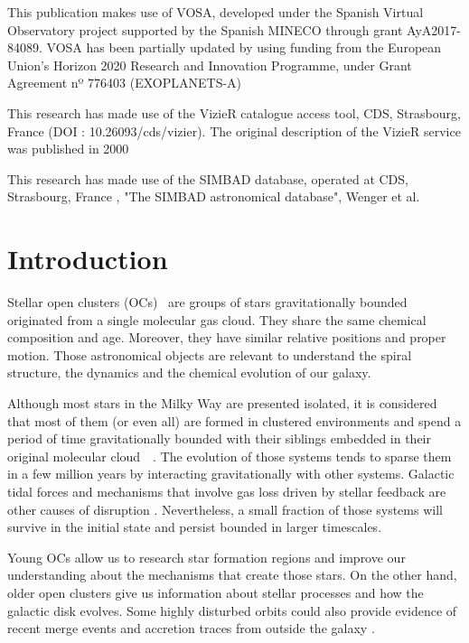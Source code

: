 \documentclass[11pt, a4paper, english]{book}
\begin{document}
\medskip

This publication makes use of VOSA, developed under the Spanish Virtual Observatory project
supported by the Spanish MINECO through grant AyA2017-84089.
VOSA has been partially updated by using funding from the European Union's Horizon 2020 Research
and Innovation Programme, under Grant Agreement nº 776403 (EXOPLANETS-A)

\medskip

This research has made use of the VizieR catalogue access tool, CDS, Strasbourg, France (DOI : 10.26093/cds/vizier).
The original description of the VizieR service was published in 2000~\cite[A\&AS 143, 23]{ochsenbein2000vizier}

\medskip

This research has made use of the SIMBAD database, operated at CDS, Strasbourg, France
\cite[2000,A\&AS,143,9]{wenger2000simbad}, "The SIMBAD astronomical database", Wenger et al.

\mainmatter
\chapter{Introduction}

Stellar open clusters (OCs)~\cite{janes1982open} are groups of stars gravitationally bounded originated from a single molecular gas cloud.
They share the same chemical composition and age. Moreover, they have similar relative positions and proper motion.
Those astronomical objects are relevant to understand the spiral structure, the dynamics and the chemical evolution of our galaxy.

Although most stars in the Milky Way are presented isolated, it is considered that most of them (or even all)
are formed in clustered environments and spend a period of time gravitationally bounded with their siblings embedded
in their original molecular cloud~\cite{clarke2000theformationofstellarclusters}~\cite{portegies2010young}.
The evolution of those systems tends to sparse them in a few million years by interacting gravitationally with other systems.
Galactic tidal forces and mechanisms that involve gas loss driven by stellar feedback are other causes of disruption
\cite{brinkmann2017bound}.
Nevertheless, a small fraction of those systems will survive in the initial state and persist bounded in larger timescales.

Young OCs allow us to research star formation regions and improve our understanding about the mechanisms that create those stars.
On the other hand, older open clusters give us information about stellar processes and how the galactic disk evolves.
Some highly disturbed orbits could also provide evidence of recent merge events and accretion traces from outside the galaxy
\cite{cantat2016abundances}.
\end{document}
